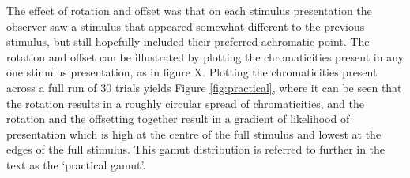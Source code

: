 The effect of rotation and offset was that on each stimulus presentation the observer saw a stimulus that appeared somewhat different to the previous stimulus, but still hopefully included their preferred achromatic point. The rotation and offset can be illustrated by plotting the chromaticities present in any one stimulus presentation, as in figure X. %
Plotting the chromaticities present across a full run of 30 trials yields Figure \ref{fig:practical}, where it can be seen that the rotation results in a roughly circular spread of chromaticities, and the rotation and the offsetting together result in a gradient of likelihood of presentation which is high at the centre of the full stimulus and lowest at the edges of the full stimulus. This gamut distribution is referred to further in the text as the `practical gamut'.





